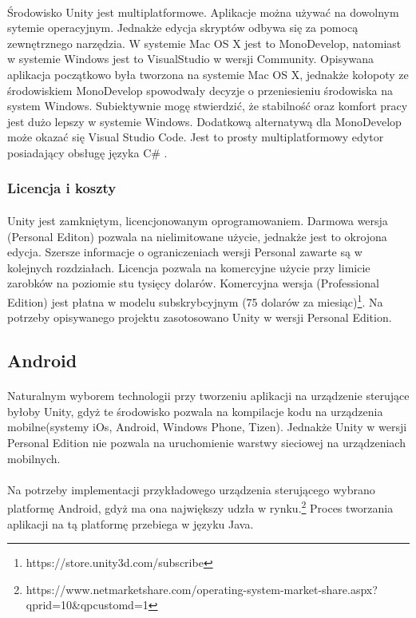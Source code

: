 \documentclass[12pt]{article}
\begin{document}
{{\paragraph{}
Środowisko Unity jest multiplatformowe. Aplikacje można używać na dowolnym sytemie operacyjnym. Jednakże edycja skryptów odbywa się za pomocą zewnętrznego narzędzia. W systemie Mac OS X jest to MonoDevelop, natomiast w systemie Windows jest to VisualStudio w wersji Community. Opisywana aplikacja początkowo była tworzona na systemie Mac OS X, jednakże kołopoty ze środowiskiem MonoDevelop spowodwały decyzje o przeniesieniu środowiska na system Windows. Subiektywnie mogę stwierdzić, że stabilność oraz komfort pracy jest dużo lepszy w systemie Windows.
Dodatkową alternatywą dla MonoDevelop może okazać się Visual Studio Code. Jest to prosty multiplatformowy edytor posiadający obsługę języka C\# .

\subsubsection{Licencja i koszty}
\paragraph{}
Unity jest zamkniętym, licencjonowanym oprogramowaniem. Darmowa wersja (Personal Editon) pozwala na nielimitowane użycie, jednakże jest to okrojona edycja. Szersze informacje o ograniczeniach wersji Personal zawarte są w kolejnych rozdziałach. Licencja pozwala na komercyjne użycie przy limicie zarobków na poziomie stu tysięcy dolarów.
Komercyjna wersja (Professional Edition) jest płatna w modelu subskrybcyjnym (75 dolarów za miesiąc)\footnote{https://store.unity3d.com/subscribe}.
Na potrzeby opisywanego projektu zasotosowano Unity w wersji Personal Edition.

\subsection{Android}
\paragraph{}
Naturalnym wyborem technologii przy tworzeniu aplikacji na urządzenie sterujące byłoby Unity, gdyż te środowisko pozwala na kompilacje kodu na urządzenia mobilne(systemy iOs, Android, Windows Phone, Tizen). Jednakże Unity w wersji Personal Edition nie pozwala na uruchomienie warstwy sieciowej na urządzeniach mobilnych.
\paragraph{}
Na potrzeby implementacji przykładowego urządzenia sterującego wybrano platformę Android, gdyż ma ona największy udzła w rynku.\footnote{https://www.netmarketshare.com/operating-system-market-share.aspx?qprid=10&qpcustomd=1} Proces tworzania aplikacji na tą platformę przebiega w języku Java.

}}
\end{document}
